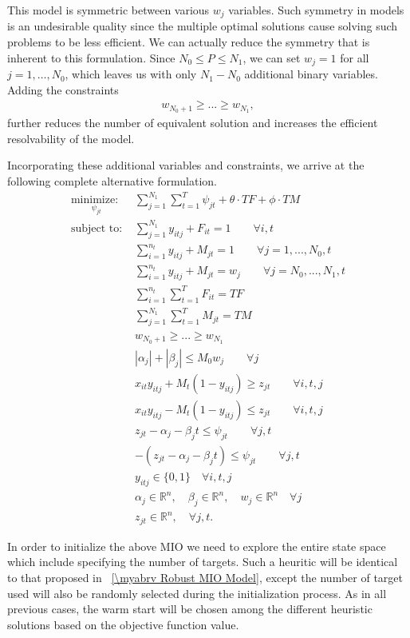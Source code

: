 This model is symmetric between various $w_j$ variables. Such symmetry in models is an undesirable quality since the multiple optimal solutions cause solving such problems to be less efficient. We can actually reduce the symmetry that is inherent to this formulation. Since $N_{0} \leq P \leq N_{1}$, we can set $w_j=1$ for all $j=1,\ldots,N_0$, which leaves us with only $N_1-N_0$ additional binary variables. Adding the constraints
\begin{align*}
w_{N_0+1}\geq ...\geq w_{N_1},
\end{align*}
further reduces the number of equivalent solution and increases the efficient resolvability of the model. 

Incorporating these additional variables and constraints, we arrive at the following complete alternative formulation.
\begin{align*}
\underset{\psi_{jt}}{\text{minimize: }} & \sum_{j=1}^{N_{1}} \sum_{t=1}^{T} \psi_{jt} + \theta \cdot TF + \phi \cdot TM\\
\text{subject to: }	& \sum_{j=1}^{N_{1}} y_{itj} + F_{it} = 1 \qquad \forall i,t \nonumber\\
				& \sum_{i=1}^{n_{t}} y_{itj} + M_{jt} = 1 \qquad \forall j=1,...,N_{0},t \nonumber \\
				& \sum_{i=1}^{n_{t}} y_{itj} + M_{jt} = w_{j} \qquad \forall j=N_{0},...,N_{1},t \nonumber \\
				& \sum_{i=1}^{n_{t}} \sum_{t=1}^{T} F_{it} = TF \nonumber \\
				& \sum_{j=1}^{N_{1}} \sum_{t=1}^{T} M_{jt} = TM \nonumber \\
				& w_{N_0+1}\geq ...\geq w_{N_1} \nonumber \\
				& |\alpha_{j}|+|\beta_{j}| \leq M_{0}w_{j}\qquad \forall j \nonumber \\
				& x_{it}y_{itj} + M_{t}(1-y_{itj}) \geq z_{jt} \qquad \forall i,t,j \nonumber \\
				& x_{it}y_{itj} - M_{t}(1-y_{itj}) \leq z_{jt} \qquad \forall i,t,j \nonumber \\
				& z_{jt} - \alpha_{j} - \beta_{j}t \leq \psi_{jt} \qquad \forall j,t \nonumber \\
				& -(z_{jt} - \alpha_{j} - \beta_{j}t) \leq \psi_{jt} \qquad \forall j,t \nonumber \\
			 	& y_{itj} \in \{0,1\} \quad \forall i,t,j \nonumber \\
				& \alpha_{j} \in \mathbb{R}^n,\quad \beta_{j} \in \mathbb{R}^n,\quad w_{j} \in \mathbb{R}^n \quad \forall j \nonumber \\
				& z_{jt} \in \mathbb{R}^n, \quad \forall j,t. \nonumber
\end{align*}

In order to initialize the above MIO we need to explore the entire state space which include specifying the number of targets. Such a heuritic will be identical to that proposed in \mysection~\ref{\myabrv Robust MIO Model}, except the number of target used will also be randomly  selected during the initialization process. As in all previous cases, the warm start will be chosen among the different heuristic solutions based on the objective function value.